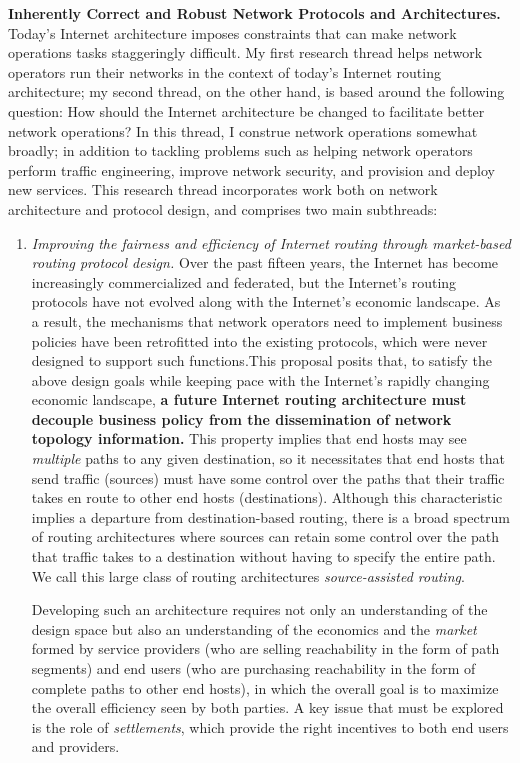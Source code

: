 \noindent
{\bf Inherently Correct and Robust Network Protocols and Architectures.}
Today's Internet architecture imposes constraints that can make network
operations tasks staggeringly difficult.  My first research thread helps
network operators run their networks in the context of today's Internet
routing architecture; my second thread, on the other hand, is based
around the following question: How should the Internet architecture be
changed to facilitate better network operations?  In this thread, I
construe network operations somewhat broadly; in addition to tackling
problems such as helping network operators perform traffic engineering,
improve network security, and provision and deploy new services.  This
research thread incorporates work both on network architecture and
protocol design, and comprises two main subthreads:
\begin{enumerate}
\item {\em Improving the fairness and efficiency of Internet routing
through market-based routing protocol design.} Over the past fifteen
years, the Internet has become increasingly commercialized and
federated, but the Internet's routing protocols have not evolved along
with the Internet's economic landscape.  As a result, the mechanisms
that network operators need to implement business policies have been
retrofitted into the existing protocols, which were never designed to
support such functions.This proposal posits that, to satisfy the above
design goals while keeping pace with the Internet's rapidly changing
economic landscape, {\bf a future Internet routing architecture must
decouple business policy from the dissemination of network topology
information.}  This property implies that end hosts may see {\em
multiple} paths to any given destination, so it necessitates that end
hosts that send traffic (sources) must have some control over the paths
that their traffic takes en route to other end hosts (destinations).
Although this characteristic implies a departure from destination-based
routing, there is a broad spectrum of routing architectures where
sources can retain some control over the path that traffic takes to a
destination without having to specify the entire path.  We call this
large class of routing architectures {\em source-assisted routing}.

Developing such an architecture requires not only an understanding of
the design space but also an understanding of the economics and the {\em
market} formed by service providers (who are selling reachability in the
form of path segments) and end users (who are purchasing reachability in
the form of complete paths to other end hosts), in which the overall
goal is to maximize the overall efficiency seen by both parties.  A key
issue that must be explored is the role of {\em settlements}, which
provide the right incentives to both end users and providers.


\end{enumerate}
